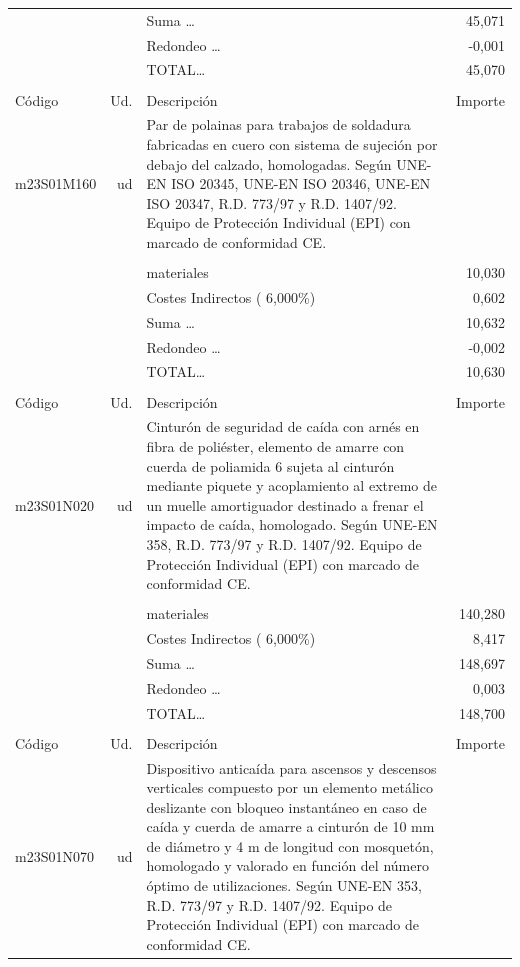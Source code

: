 \begin{supertabular}{l r p{60mm} r}
&&Suma \ldots&    45,071\\%
&&Redondeo \ldots&    {-}0,001\\%
%
&&TOTAL\ldots&    45,070\\%
&&&\\%
Código&Ud.&Descripción&Importe\\%
\hline%
m23S01M160&ud&Par de polainas para trabajos de soldadura fabricadas en cuero con sistema de sujeción por debajo del calzado, homologadas. Según UNE{-}EN ISO 20345, UNE{-}EN ISO 20346, UNE{-}EN ISO 20347, R.D. 773/97 y R.D. 1407/92. Equipo de Protección Individual (EPI) con marcado de conformidad CE.&\\%
&&&\\%
&&materiales&    10,030\\%
&&Costes Indirectos (     6,000\%)&     0,602\\%
&&Suma \ldots&    10,632\\%
&&Redondeo \ldots&    {-}0,002\\%
%
&&TOTAL\ldots&    10,630\\%
&&&\\%
Código&Ud.&Descripción&Importe\\%
\hline%
m23S01N020&ud&Cinturón de seguridad de caída con arnés en fibra de poliéster, elemento de amarre con cuerda de poliamida 6 sujeta al cinturón mediante piquete y acoplamiento al extremo de un muelle amortiguador destinado a frenar el impacto de caída, homologado. Según UNE{-}EN 358, R.D. 773/97 y R.D. 1407/92. Equipo de Protección Individual (EPI) con marcado de conformidad CE.&\\%
&&&\\%
&&materiales&   140,280\\%
&&Costes Indirectos (     6,000\%)&     8,417\\%
&&Suma \ldots&   148,697\\%
&&Redondeo \ldots&     0,003\\%
%
&&TOTAL\ldots&   148,700\\%
&&&\\%
Código&Ud.&Descripción&Importe\\%
\hline%
m23S01N070&ud&Dispositivo anticaída para ascensos y descensos verticales compuesto por un elemento metálico deslizante con bloqueo instantáneo en caso de caída y cuerda de amarre a cinturón de 10 mm de diámetro y 4 m de longitud con mosquetón, homologado y valorado en función del número óptimo de utilizaciones. Según UNE{-}EN 353, R.D. 773/97 y R.D. 1407/92. Equipo de Protección Individual (EPI) con marcado de conformidad CE.&\\%

\end{supertabular}

